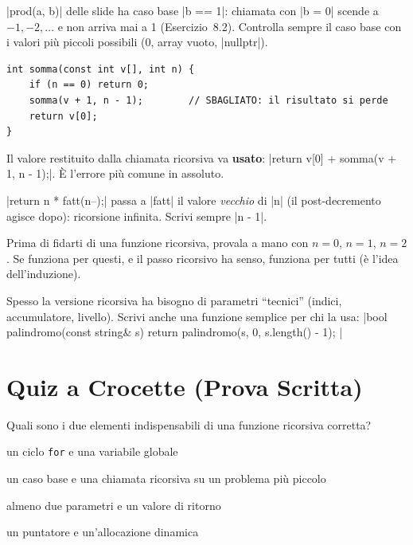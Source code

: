 \begin{trappola}
\cc|prod(a, b)| delle slide ha caso base \cc|b == 1|: chiamata con \cc|b = 0| scende
a $-1, -2, \ldots$ e non arriva mai a 1 (Esercizio~8.2). Controlla sempre il caso
base con i valori più piccoli possibili (0, array vuoto, \cc|nullptr|).
\end{trappola}

\begin{trappola}
\begin{lstlisting}
int somma(const int v[], int n) {
    if (n == 0) return 0;
    somma(v + 1, n - 1);        // SBAGLIATO: il risultato si perde
    return v[0];
}
\end{lstlisting}
Il valore restituito dalla chiamata ricorsiva va \textbf{usato}:
\cc|return v[0] + somma(v + 1, n - 1);|. È l'errore più comune in assoluto.
\end{trappola}

\begin{trappola}
\cc|return n * fatt(n--);| passa a \cc|fatt| il valore \emph{vecchio} di \cc|n| (il
post-decremento agisce dopo): ricorsione infinita. Scrivi sempre \cc|n - 1|.
\end{trappola}

\begin{consiglio}
Prima di fidarti di una funzione ricorsiva, provala a mano con $n = 0$, $n = 1$,
$n = 2$. Se funziona per questi, e il passo ricorsivo ha senso, funziona per tutti
(è l'idea dell'induzione).
\end{consiglio}

\begin{consiglio}
Spesso la versione ricorsiva ha bisogno di parametri ``tecnici'' (indici,
accumulatore, livello). Scrivi anche una funzione semplice per chi la usa:
\cc|bool palindromo(const string& s) { return palindromo(s, 0, s.length() - 1); }|
\end{consiglio}

\section{Quiz a Crocette (Prova Scritta)}

\begin{quiz}{Quali sono i due elementi indispensabili di una funzione ricorsiva corretta?}
  \item un ciclo \texttt{for} e una variabile globale
  \item un caso base e una chiamata ricorsiva su un problema più piccolo
  \item almeno due parametri e un valore di ritorno
  \item un puntatore e un'allocazione dinamica
\end{quiz}

